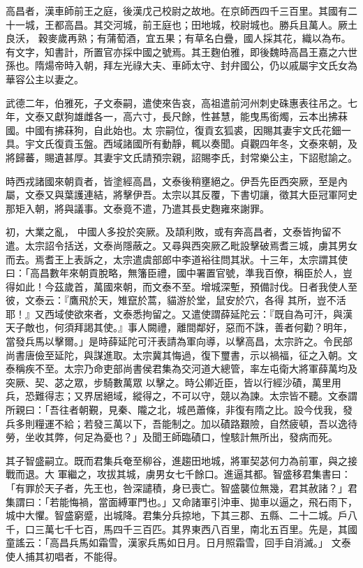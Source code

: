 \begin{pinyinscope}
 高昌者，漢車師前王之庭，後漢戊己校尉之故地。在京師西四千三百里。其國有二十一城，王都高昌。其交河城，前王庭也；田地城，校尉城也。勝兵且萬人。厥土良沃，
 穀麥歲再熟；有蒲萄酒，宜五果；有草名白疊，國人採其花，織以為布。有文字，知書計，所置官亦採中國之號焉。其王麴伯雅，即後魏時高昌王嘉之六世孫也。隋煬帝時入朝，拜左光祿大夫、車師太守、封弁國公，仍以戚屬宇文氏女為華容公主以妻之。



 武德二年，伯雅死，子文泰嗣，遣使來告哀，高祖遣前河州刺史硃惠表往吊之。七年，文泰又獻狗雄雌各一，高六寸，長尺餘，性甚慧，能曳馬銜燭，云本出拂菻國。中國有拂菻狗，自此始也。太
 宗嗣位，復貢玄狐裘，因賜其妻宇文氏花鈿一具。宇文氏復貢玉盤。西域諸國所有動靜，輒以奏聞。貞觀四年冬，文泰來朝，及將歸蕃，賜遺甚厚。其妻宇文氏請預宗親，詔賜李氏，封常樂公主，下詔慰諭之。



 時西戎諸國來朝貢者，皆塗經高昌，文泰後稍壅絕之。伊吾先臣西突厥，至是內屬，文泰又與葉護連結，將擊伊吾。太宗以其反覆，下書切讓，徵其大臣冠軍阿史那矩入朝，將與議事。文泰竟不遣，乃遣其長史麴雍來謝罪。



 初，大業之亂，
 中國人多投於突厥。及頡利敗，或有奔高昌者，文泰皆拘留不遣。太宗詔令括送，文泰尚隱蔽之。又尋與西突厥乙毗設擊破焉耆三城，虜其男女而去。焉耆王上表訴之，太宗遣虞部郎中李道裕往問其狀。十三年，太宗謂其使曰：「高昌數年來朝貢脫略，無籓臣禮，國中署置官號，準我百僚，稱臣於人，豈得如此！今茲歲首，萬國來朝，而文泰不至。增城深塹，預備討伐。日者我使人至彼，文泰云：『鷹飛於天，雉竄於蒿，貓游於堂，鼠安於穴，各得
 其所，豈不活耶！』又西域使欲來者，文泰悉拘留之。又遣使謂薛延陀云：『既自為可汗，與漢天子敵也，何須拜謁其使。』事人闕禮，離間鄰好，惡而不誅，善者何勸？明年，當發兵馬以擊爾。」是時薛延陀可汗表請為軍向導，以擊高昌，太宗許之。令民部尚書唐儉至延陀，與謀進取。太宗冀其悔過，復下璽書，示以禍福，征之入朝。文泰稱疾不至。太宗乃命吏部尚書侯君集為交河道大總管，率左屯衛大將軍薛萬均及突厥、契、苾之眾，步騎數萬眾
 以擊之。時公卿近臣，皆以行經沙磧，萬里用兵，恐難得志；又界居絕域，縱得之，不可以守，競以為諫。太宗皆不聽。文泰謂所親曰：「吾往者朝覲，見秦、隴之北，城邑蕭條，非復有隋之比。設今伐我，發兵多則糧運不給；若發三萬以下，吾能制之。加以磧路艱險，自然疲頓，吾以逸待勞，坐收其弊，何足為憂也？」及聞王師臨磧口，惶駭計無所出，發病而死。



 其子智盛嗣立。既而君集兵奄至柳谷，進趨田地城，將軍契苾何力為前軍，與之接戰而退。大
 軍繼之，攻拔其城，虜男女七千餘口。進逼其都。智盛移君集書曰：「有罪於天子者，先王也，咎深譴積，身已喪亡。智盛襲位無幾，君其赦諸？」君集謂曰：「若能悔禍，當面縛軍門也。」又命諸軍引沖車、拋車以逼之，飛石雨下，城中大懼。智盛窮蹙，出城降。君集分兵掠地，下其三郡、五縣、二十二城。戶八千，口三萬七千七百，馬四千三百匹。其界東西八百里，南北五百里。先是，其國童謠云：「高昌兵馬如霜雪，漢家兵馬如日月。日月照霜雪，回手自消滅。」
 文泰使人捕其初唱者，不能得。




\end{pinyinscope}
